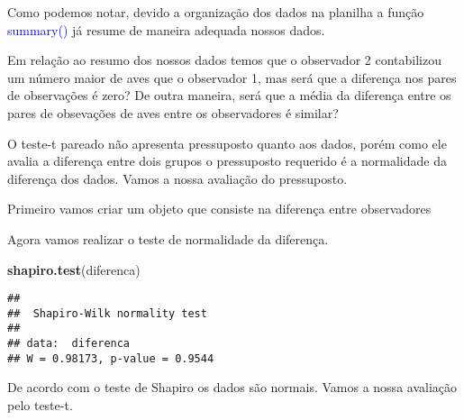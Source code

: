 \documentclass[14pt,titlepage, oneside, openany, a4paper]{book}
\newenvironment{Shaded}{\begin{snugshade}}{\end{snugshade}}
\newcommand{\DataTypeTok}[1]{\textcolor[rgb]{0.13,0.29,0.53}{#1}}
\newcommand{\FloatTok}[1]{\textcolor[rgb]{0.00,0.00,0.81}{#1}}
\newcommand{\KeywordTok}[1]{\textcolor[rgb]{0.13,0.29,0.53}{\textbf{#1}}}
\newcommand{\NormalTok}[1]{#1}
\newcommand{\OperatorTok}[1]{\textcolor[rgb]{0.81,0.36,0.00}{\textbf{#1}}}
\newcommand{\OtherTok}[1]{\textcolor[rgb]{0.56,0.35,0.01}{#1}}
\newcommand{\StringTok}[1]{\textcolor[rgb]{0.31,0.60,0.02}{#1}}
\begin{document}
Como podemos notar, devido a organização dos dados na planilha a função \textcolor{blue}{summary()} já resume de maneira adequada nossos dados.

Em relação ao resumo dos nossos dados temos que o observador 2 contabilizou um número maior de aves que o observador 1, mas será que a diferença nos pares de observações é zero? De outra maneira, será que a média da diferença entre os pares de obsevações de aves entre os observadores é similar?

O teste-t pareado não apresenta pressuposto quanto aos dados, porém como ele avalia a diferença entre dois grupos o pressuposto requerido é a normalidade da diferença dos dados. Vamos a nossa avaliação do pressuposto.

Primeiro vamos criar um objeto que consiste na diferença entre observadores

\begin{Shaded}
\end{Shaded}

Agora vamos realizar o teste de normalidade da diferença.

\begin{Shaded}
\begin{Highlighting}[]
\KeywordTok{shapiro.test}\NormalTok{(diferenca)}
\end{Highlighting}
\end{Shaded}

\begin{verbatim}
## 
##  Shapiro-Wilk normality test
## 
## data:  diferenca
## W = 0.98173, p-value = 0.9544
\end{verbatim}

De acordo com o teste de Shapiro os dados são normais. Vamos a nossa avaliação pelo teste-t.

\begin{Shaded}
\end{Shaded}
\end{document}
